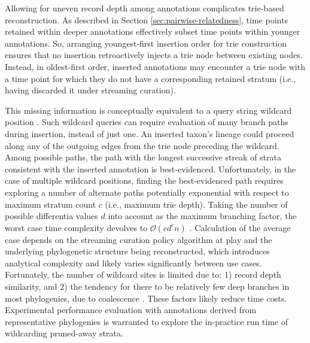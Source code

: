 Allowing for uneven record depth among annotations complicates trie-based reconstruction.
As described in Section \ref{sec:pairwise-relatedness}, time points retained within deeper annotations effectively subset time points within younger annotations.
So, arranging youngest-first insertion order for trie construction ensures that no insertion retroactively injects a trie node between existing nodes.
Instead, in oldest-first order, inserted annotations may encounter a trie node with a time point for which they do not have a corresponding retained stratum (i.e., having discarded it under streaming curation).

This missing information is conceptually equivalent to a query string wildcard position \citep{fukuyama2016partial}.
Such wildcard queries can require evaluation of many branch paths during insertion, instead of just one.
An inserted taxon's lineage could proceed along any of the outgoing edges from the trie node preceding the wildcard.
Among possible paths, the path with the longest successive streak of strata consistent with the inserted annotation is best-evidenced.
Unfortunately, in the case of multiple wildcard positions, finding the best-evidenced path requires exploring a number of alternate paths potentially exponential with respect to maximum stratum count $c$ (i.e., maximum trie depth).
Taking the number of possible differentia values $d$ into account as the maximum branching factor, the worst case time complexity devolves to $\mathcal{O}(c d^c n)$ \citep{fukuyama2016partial}.
Calculation of the average case depends on the streaming curation policy algorithm at play and the underlying phylogenetic structure being reconstructed, which introduces analytical complexity and likely varies significantly between use cases.
Fortunately, the number of wildcard sites is limited due to: 1) record depth similarity, and 2) the tendency for there to be relatively few deep branches in most phylogenies, due to coalescence \citep{nordborgCoalescentTheory2019, berestyckiRecentProgressCoalescent2009}.
These factors likely reduce time costs.
Experimental performance evaluation with annotations derived from representative phylogenies is warranted to explore the in-practice run time of wildcarding pruned-away strata.



